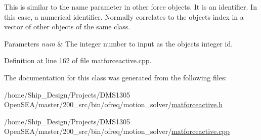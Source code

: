 This is similar to the name parameter in other force objects. It is an identifier. In this case, a numerical identifier. Normally correlates to the objects index in a vector of other objects of the same class. 
\begin{DoxyParams}{Parameters}
{\em num} & The integer number to input as the objects integer id. \\
\hline
\end{DoxyParams}


Definition at line 162 of file matforceactive.\-cpp.



The documentation for this class was generated from the following files\-:\begin{DoxyCompactItemize}
\item 
/home/\-Ship\-\_\-\-Design/\-Projects/\-D\-M\-S1305 Open\-S\-E\-A/master/200\-\_\-src/bin/ofreq/motion\-\_\-solver/\hyperlink{matforceactive_8h}{matforceactive.\-h}\item 
/home/\-Ship\-\_\-\-Design/\-Projects/\-D\-M\-S1305 Open\-S\-E\-A/master/200\-\_\-src/bin/ofreq/motion\-\_\-solver/\hyperlink{matforceactive_8cpp}{matforceactive.\-cpp}\end{DoxyCompactItemize}
